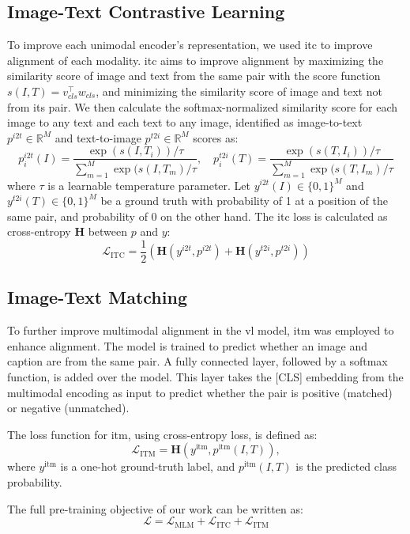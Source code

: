 \subsection{Image-Text Contrastive Learning}
To improve each unimodal encoder's representation, we used \acrlong{itc} to improve alignment of each modality.  
\acrshort{itc} aims to improve alignment by maximizing the similarity score of image and text from the same pair with the score function \(s(I, T) = v_{cls}^\top w_{cls}\), and minimizing the similarity score of image and text not from its pair.  
We then calculate the softmax-normalized similarity score for each image to any text and each text to any image, identified as image-to-text \(p^{i2t} \in \mathbb{R}^{M}\) and text-to-image \(p^{t2i} \in \mathbb{R}^{M}\) scores as:  
\[
    p^{i2t}_i(I) = \frac{ \exp{(s(I,T_i))/\tau} }{ \sum_{m=1}^{M}\exp{(s(I,T_m)/\tau} }, \quad p^{t2i}_i(T) = \frac{ \exp{(s(T,I_i))/\tau} }{ \sum_{m=1}^{M}\exp{(s(T,I_m)/\tau} }
\]
where \(\tau\) is a learnable temperature parameter.  
Let \( y^{i2t}(I) \in \{0,1\}^M \) and \( y^{t2i}(T) \in \{0,1\}^M \) be a ground truth with probability of 1 at a position of the same pair, and probability of 0 on the other hand.  
The \acrshort{itc} loss is calculated as cross-entropy \(\mathbf{H}\) between \(p\) and \(y\):  
\[
    \mathcal{L}_{\text{ITC}} = \frac{1}{2}(\mathbf{H}(y^{i2t},p^{i2t}) + \mathbf{H}(y^{t2i},p^{t2i}))
\]
\subsection{Image-Text Matching}
To further improve multimodal alignment in the \acrshort{vl} model, \acrlong{itm} was employed to enhance alignment.  
The model is trained to predict whether an image and caption are from the same pair.  
A fully connected layer, followed by a softmax function, is added over the model.  
This layer takes the [CLS] embedding from the multimodal encoding as input to predict whether the pair is positive (matched) or negative (unmatched).  

The loss function for \acrshort{itm}, using cross-entropy loss, is defined as:  
\[
    \mathcal{L}_{\text{ITM}} = \mathbf{H}(y^{\text{itm}}, p^{\text{itm}}(I, T)),
\]
where \(y^{\text{itm}}\) is a one-hot ground-truth label, and \(p^{\text{itm}}(I, T)\) is the predicted class probability.

The full pre-training objective of our work can be written as:
\[
    \mathcal{L} = \mathcal{L}_{\text{MLM}} + \mathcal{L}_{\text{ITC}} + \mathcal{L}_{\text{ITM}}
\]


